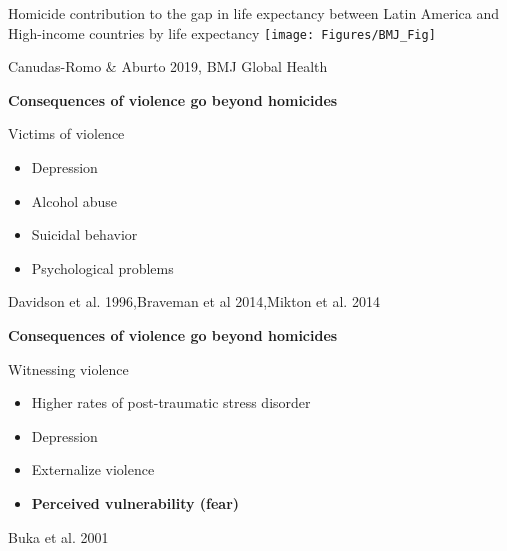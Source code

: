\documentclass[xcolor={dvipsnames}]{beamer}
\begin{document}
\begin{frame}
	\begin{center}
		\large{Homicide contribution to the gap in life expectancy between Latin America and High-income countries by life expectancy}
	\hspace*{-.8cm}    
	\texttt{[image: Figures/BMJ\_Fig]}	
	
		\end{center}

	\tiny{Canudas-Romo \& Aburto 2019, BMJ Global Health}
\end{frame}








\begin{frame}
	\LARGE{
		\begin{center}
			\textbf{Consequences of violence go beyond homicides}
		\end{center}
	
	\pause
	
	Victims of violence
	\begin{itemize}
		
		\item Depression

		\item Alcohol abuse
		
		\item Suicidal behavior
		
		\item Psychological problems
						
	\end{itemize}	
	
		}
		\tiny{Davidson et al. 1996,Braveman et al 2014,Mikton et al. 2014}
\end{frame}


\begin{frame}
	\LARGE{
		\begin{center}
			\textbf{Consequences of violence go beyond homicides}
		\end{center}
	
	Witnessing violence
	
		\begin{itemize}
		
		\item Higher rates of post-traumatic stress disorder

		\item Depression 
		
		\item Externalize violence
		
		\item \textbf{Perceived vulnerability (fear)} 
						
	\end{itemize}
	
		}
		\tiny{Buka et al. 2001}
\end{frame}
\end{document}
